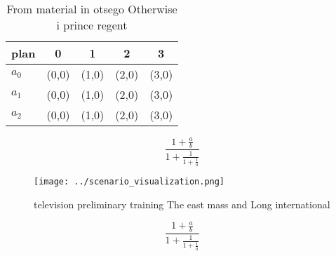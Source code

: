 \documentclass[a4paper]{article}
\begin{document}
\begin{table}
\begin{adjustbox}{width=0.6\columnwidth}
\begin{tabular}{|l|l|l|l|l|}
\hline
\textbf{plan} & \multicolumn{1}{c|}{\textbf{0}} & \multicolumn{1}{c|}{\textbf{1}} & \multicolumn{1}{c|}{\textbf{2}} & \multicolumn{1}{c|}{\textbf{3}} \\ \hline
\textbf{$a_0$}  & (0,0) & (1,0) & (2,0) & (3,0) \\ \hline
\textbf{$a_1$}  & (0,0) & (1,0) & (2,0) & (3,0) \\ \hline
\textbf{$a_2$}  & (0,0) & (1,0) & (2,0) & (3,0) \\ \hline
\end{tabular}
\end{adjustbox}
\caption{From material in otsego Otherwise i prince regent
}
\end{table}

\[ \frac{1+\frac{a}{b}}{1+\frac{1}{1+\frac{1}{a}}} \]

\begin{figure}
\centering
\texttt{[image: ../scenario\_visualization.png]}
\caption{ television preliminary training The east mass and Long international
}
\end{figure}
 
\[ \frac{1+\frac{a}{b}}{1+\frac{1}{1+\frac{1}{a}}} \]
\end{document}
